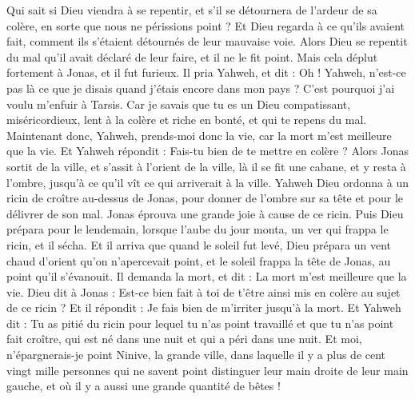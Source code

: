 \begin{multicols}{2}
Qui sait si Dieu viendra à se repentir, et s'il se détournera de l'ardeur de sa colère, en sorte que nous ne périssions point ?
Et Dieu regarda à ce qu'ils avaient fait, comment ils s'étaient détournés de leur mauvaise voie. Alors Dieu se repentit du mal qu'il avait déclaré de leur faire, et il ne le fit point.
\VerseOne{}Mais cela déplut fortement à Jonas, et il fut furieux.
Il pria Yahweh, et dit : Oh ! Yahweh, n'est-ce pas là ce que je disais quand j'étais encore dans mon pays ? C'est pourquoi j'ai voulu m'enfuir à Tarsis. Car je savais que tu es un Dieu compatissant, miséricordieux, lent à la colère et riche en bonté, et qui te repens du mal.
Maintenant donc, Yahweh, prends-moi donc la vie, car la mort m'est meilleure que la vie.
Et Yahweh répondit : Fais-tu bien de te mettre en colère ?
Alors Jonas sortit de la ville, et s'assit à l'orient de la ville, là il se fit une cabane, et y resta à l'ombre, jusqu'à ce qu'il vît ce qui arriverait à la ville.
Yahweh Dieu ordonna à un ricin de croître au-dessus de Jonas, pour donner de l’ombre sur sa tête et pour le délivrer de son mal. Jonas éprouva une grande joie à cause de ce ricin.
Puis Dieu prépara pour le lendemain, lorsque l'aube du jour monta, un ver qui frappa le ricin, et il sécha.
Et il arriva que quand le soleil fut levé, Dieu prépara un vent chaud d'orient qu'on n'apercevait point, et le soleil frappa la tête de Jonas, au point qu’il s’évanouit. Il demanda la mort, et dit : La mort m'est meilleure que la vie.
Dieu dit à Jonas : Est-ce bien fait à toi de t'être ainsi mis en colère au sujet de ce ricin ? Et il répondit : Je fais bien de m’irriter jusqu’à la mort.
Et Yahweh dit : Tu as pitié du ricin pour lequel tu n'as point travaillé et que tu n'as point fait croître, qui est né dans une nuit et qui a péri dans une nuit.
Et moi, n'épargnerais-je point Ninive, la grande ville, dans laquelle il y a plus de cent vingt mille personnes qui ne savent point distinguer leur main droite de leur main gauche, et où il y a aussi une grande quantité de bêtes !
\PPE{}
\end{multicols}
